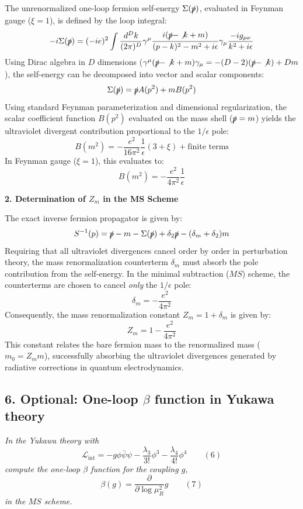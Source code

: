 The unrenormalized one-loop fermion self-energy $\Sigma(\slashed{p})$, evaluated in Feynman gauge ($\xi = 1$), is defined by the loop integral:
\[
    -i\Sigma(\slashed{p}) = (-ie)^2 \int \frac{d^D k}{(2\pi)^D} \gamma^\mu \frac{i(\slashed{p} - \not{k} + m)}{(p-k)^2 - m^2 + i\epsilon} \gamma_\mu \frac{-ig_{\mu\nu}}{k^2 + i\epsilon}
\]
Using Dirac algebra in $D$ dimensions ($\gamma^\mu (\slashed{p} - \not{k} + m) \gamma_\mu = - (D-2)(\slashed{p} - \not{k}) + Dm$), the self-energy can be decomposed into vector and scalar components:
\[
    \Sigma(\slashed{p}) = \slashed{p} A(p^2) + m B(p^2)
\]
Using standard Feynman parameterization and dimensional regularization, the scalar coefficient function $B(p^2)$ evaluated on the mass shell ($\slashed{p} = m$) yields the ultraviolet divergent contribution proportional to the $1/\epsilon$ pole:
\[
    B(m^2) = -\frac{e^2}{16\pi^2} \frac{1}{\epsilon} (3 + \xi) + \text{finite terms}
\]
In Feynman gauge ($\xi = 1$), this evaluates to:
\[
    B(m^2) = -\frac{e^2}{4\pi^2} \frac{1}{\epsilon}
\]

\textbf{2. Determination of $Z_m$ in the MS Scheme}

The exact inverse fermion propagator is given by:
\[
    S^{-1}(p) = \slashed{p} - m - \Sigma(\slashed{p}) + \delta_2 \slashed{p} - (\delta_m + \delta_2)m
\]
Requiring that all ultraviolet divergences cancel order by order in perturbation theory, the mass renormalization counterterm $\delta_m$ must absorb the pole contribution from the self-energy. In the minimal subtraction ($MS$) scheme, the counterterms are chosen to cancel \textit{only} the $1/\epsilon$ pole:
\[
    \delta_m = -\frac{e^2}{4\pi^2}
\]
Consequently, the mass renormalization constant $Z_m = 1 + \delta_m$ is given by:
\[
    Z_m = 1 - \frac{e^2}{4\pi^2}
\]
This constant relates the bare fermion mass to the renormalized mass ($m_0 = Z_m m$), successfully absorbing the ultraviolet divergences generated by radiative corrections in quantum electrodynamics.


\subsection*{6. Optional: One-loop $\beta$ function in Yukawa theory}

\begin{center}
    \textit{In the Yukawa theory with}
    \[
        \mathcal{L}_{\text{int}} = -g \phi \bar{\psi}\psi - \frac{\lambda_3}{3!} \phi^3 - \frac{\lambda_4}{4!} \phi^4 \qquad (6)
    \]
    \textit{compute the one-loop $\beta$ function for the coupling $g$,}
    \[
        \beta(g) = \frac{\partial}{\partial \log \mu_R^2} g \qquad (7)
    \]
    \textit{in the $MS$ scheme.}
\end{center}


